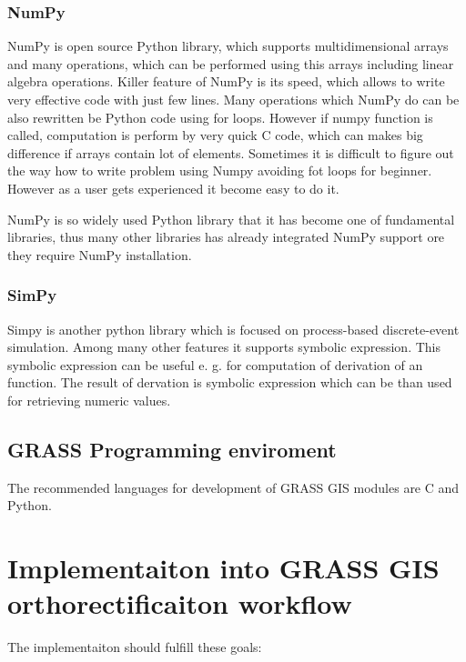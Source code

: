 \documentclass[a4paper,12pt]{report}
\begin{document}
\subsubsection{NumPy}

NumPy is open source Python library, which supports multidimensional arrays and many operations, which can be
performed using this arrays including linear algebra operations. Killer feature of NumPy is its speed,
which allows to write very effective code with just few lines. Many operations which NumPy do can be 
also rewritten be Python code using  for loops. However if numpy function is called,
computation is perform by very quick C code, which can makes big difference if arrays contain 
lot of elements. Sometimes it is difficult to figure out the way how 
to write problem using Numpy avoiding fot loops  for beginner. However as a user gets experienced 
it become easy to do it. 

NumPy is so widely used Python library that it has become one of fundamental libraries, thus many
other libraries has already integrated NumPy support ore they require NumPy installation.

\subsubsection{SimPy}

Simpy is another python library which is focused on process-based discrete-event simulation.
Among many other features it supports symbolic expression. This symbolic expression can be useful
e. g. for computation of derivation of an function. The result of dervation is symbolic expression which can 
be than used for retrieving numeric values. 

\subsection{GRASS Programming  enviroment}

The recommended languages for development of GRASS GIS modules are C and Python.




\section{Implementaiton into GRASS GIS orthorectificaiton workflow}

The implementaiton should fulfill these goals:
\end{document}
